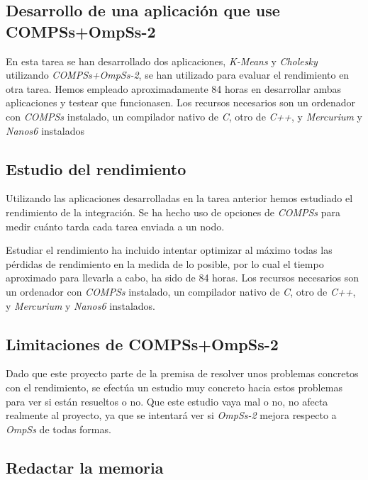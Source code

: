 \subsection{Desarrollo de una aplicación que use COMPSs+OmpSs-2}

En esta tarea se han desarrollado dos aplicaciones, \textit{K-Means} y \textit{Cholesky} utilizando \textit{COMPSs+OmpSs-2}, se han utilizado para evaluar el rendimiento en otra tarea. Hemos empleado aproximadamente 84 horas en desarrollar ambas aplicaciones y testear que funcionasen. Los recursos necesarios son un ordenador con \textit{COMPSs} instalado, un compilador nativo de \textit{C}, otro de \textit{C++}, y \textit{Mercurium} y \textit{Nanos6} instalados

\subsection{Estudio del rendimiento}

Utilizando las aplicaciones desarrolladas en la tarea anterior hemos estudiado el rendimiento de la integración. Se ha hecho uso de opciones de \textit{COMPSs} para medir cuánto tarda cada tarea enviada a un nodo. 
\par\bigskip

Estudiar el rendimiento ha incluido intentar optimizar al máximo todas las pérdidas de rendimiento en la medida de lo posible, por lo cual el tiempo aproximado para llevarla a cabo, ha sido de 84 horas. Los recursos necesarios son un ordenador con \textit{COMPSs} instalado, un compilador nativo de \textit{C}, otro de \textit{C++}, y \textit{Mercurium} y \textit{Nanos6} instalados.

\subsection{Limitaciones de COMPSs+OmpSs-2}

Dado que este proyecto parte de la premisa de resolver unos problemas concretos con el rendimiento, se efectúa un estudio muy concreto hacia estos problemas para ver si están resueltos o no. Que este estudio vaya mal o no, no afecta realmente al proyecto, ya que se intentará ver si \textit{OmpSs-2} mejora respecto a \textit{OmpSs} de todas formas.

\subsection{Redactar la memoria}

